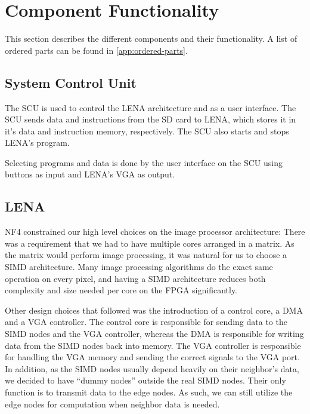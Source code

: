 \section{Component Functionality}

This section describes the different components and their functionality. A list
of ordered parts can be found in \ref{app:ordered-parts}.

\subsection{System Control Unit}

The \acf{SCU} is used to control the \ac{LENA} architecture and as a user interface.
The SCU sends data and instructions from the \ac{SD} card to \ac{LENA}, which stores
it in it's data and instruction memory, respectively. The \ac{SCU} also starts and stops \ac{LENA}'s program.

Selecting programs and data is done by the user interface on the \ac{SCU} using buttons as input
and \ac{LENA}'s VGA as output. 

\subsection{LENA}

NF4 constrained our high level choices on the image processor architecture:
There was a requirement that we had to have multiple cores arranged in a
matrix. As the matrix would perform image processing, it was natural for us to
choose a \ac{SIMD} architecture. Many image processing algorithms do the exact
same operation on every pixel, and having a \ac{SIMD} architecture reduces both
complexity and size needed per core on the \ac{FPGA} significantly.

Other design choices that followed was the introduction of a control core, a
\ac{DMA} and a \ac{VGA} controller. The control core is responsible for sending
data to the \ac{SIMD} nodes and the \ac{VGA} controller, whereas the \ac{DMA} is
responsible for writing data from the \ac{SIMD} nodes back into memory. The
\ac{VGA} controller is responsible for handling the \ac{VGA} memory and sending
the correct signals to the \ac{VGA} port. In addition, as the \ac{SIMD} nodes
usually depend heavily on their neighbor's data, we decided to have ``dummy
nodes'' outside the real \ac{SIMD} nodes. Their only function is to transmit
data to the edge nodes. As such, we can still utilize the edge nodes for
computation when neighbor data is needed.

